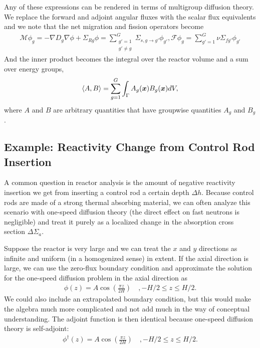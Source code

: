 Any of these expressions can be rendered in terms of multigroup diffusion theory. We replace the forward and adjoint angular fluxes with the scalar flux equivalents and we note that the net migration and fission operators become
\begin{subequations}
\begin{align}
  \mathcal{M} \phi_g = -\nabla D_g \nabla \phi + \Sigma_{Rg} \phi = \sum_{\substack{g' =1 \\ g' \ne g}}^G  \Sigma_{s,g \rightarrow g'} \phi_{g'} ,
  \mathcal{F} \phi_g =  \sum_{g'=1}^G  \nu\Sigma_{fg'} \phi_{g'}   
\end{align}
\end{subequations}
And the inner product becomes the integral over the reactor volume and a sum over energy groups,
\begin{align}
  \left< A, B \right> = \sum_{g=1}^G \int_\Gamma A_g(\bm{x}) B_g(\bm{x}) dV ,
\end{align}
where $A$ and $B$ are arbitrary quantities that have groupwise quantities $A_g$ and $B_g$.

\subsection{Example: Reactivity Change from Control Rod Insertion}

A common question in reactor analysis is the amount of negative reactivity insertion we get from inserting a control rod a certain depth $\Delta h$. Because control rods are made of a strong thermal absorbing material, we can often analyze this scenario with one-speed diffusion theory (the direct effect on fast neutrons is negligible) and treat it purely as a localized change in the absorption cross section $\Delta \Sigma_a$.

Suppose the reactor is very large and we can treat the $x$ and $y$ directions as infinite and uniform (in a homogenized sense) in extent. If the axial direction is large, we can use the zero-flux boundary condition and approximate the solution for the one-speed diffusion problem in the axial direction as
\begin{align}
  \phi(z) = A \cos\left( \frac{\pi z}{2H} \right) \quad, -H/2 \le z \le H/2 .
\end{align} 
We could also include an extrapolated boundary condition, but this would make the algebra much more complicated and not add much in the way of conceptual understanding. The adjoint function is then identical because one-speed diffusion theory is self-adjoint:
\begin{align}
  \phi^\dagger(z) = A \cos\left( \frac{\pi z}{2H} \right) \quad, -H/2 \le z \le H/2 .
\end{align}

